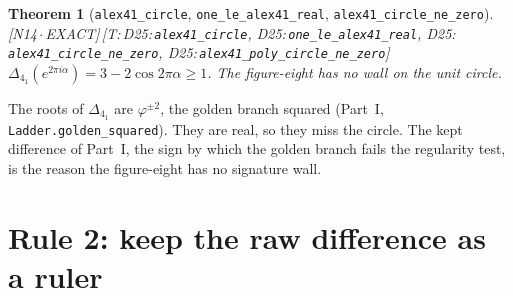 \documentclass[11pt]{article}
\newtheorem{theorem}{Theorem}
\theoremstyle{definition}
\newcommand{\lean}[1]{\texttt{\small #1}}
\newcommand{\dtag}[1]{#1}
\begin{document}
\begin{theorem}[\lean{alex41\_circle}, \lean{one\_le\_alex41\_real}, \lean{alex41\_circle\_ne\_zero}]\dtag{\textsf{\small[N14\,$\cdot$\,EXACT]}\,\textsf{\small[T:\,D25:\,\lean{alex41\_\allowbreak{}circle}, D25:\,\lean{one\_\allowbreak{}le\_\allowbreak{}alex41\_\allowbreak{}real}, D25:\,\lean{alex41\_\allowbreak{}circle\_\allowbreak{}ne\_\allowbreak{}zero}, D25:\,\lean{alex41\_\allowbreak{}poly\_\allowbreak{}circle\_\allowbreak{}ne\_\allowbreak{}zero}]}}
$\Delta_{4_1}(e^{2\pi i\alpha})=3-2\cos2\pi\alpha\ge1$. The figure-eight has no wall on the unit circle.
\end{theorem}
The roots of $\Delta_{4_1}$ are $\varphi^{\pm2}$, the golden branch squared (Part~I, \lean{Ladder.golden\_squared}). They are real, so they miss the circle. The kept difference of Part~I, the sign by which the golden branch fails the regularity test, is the reason the figure-eight has no signature wall.

\section{Rule 2: keep the raw difference as a ruler}\label{sec:rule2}
\end{document}
